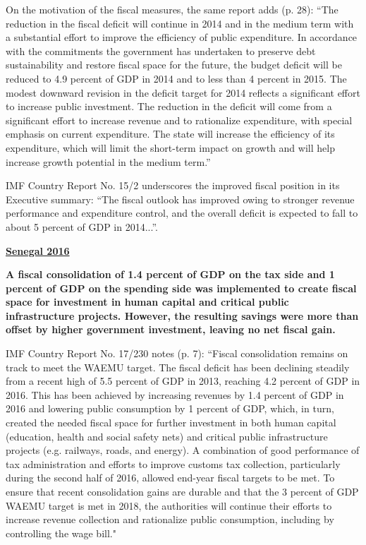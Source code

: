 On the motivation of the fiscal measures, the same report adds (p. 28): “The reduction in the fiscal deficit will continue in 2014 and in the medium term with a substantial effort to improve the efficiency of public expenditure. In accordance with the commitments the government has undertaken to preserve debt sustainability and restore fiscal space for the future, the budget deficit will be reduced to 4.9 percent of GDP in 2014 and to less than 4 percent in 2015. The modest downward revision in the deficit target for 2014 reflects a significant effort to increase public investment. The reduction in the deficit will come from a significant effort to increase revenue and to rationalize expenditure, with special emphasis on current expenditure. The state will increase the efficiency of its expenditure, which will limit the short-term impact on growth and will help increase growth potential in the medium term.”

IMF Country Report No. 15/2 underscores the improved fiscal position in its Executive summary: “The fiscal outlook has improved owing to stronger revenue performance and expenditure control, and the overall deficit is expected to fall to about 5 percent of GDP in 2014...”. 

\textbf{\underline{Senegal 2016}}

\textbf{A fiscal consolidation of 1.4 percent of GDP on the tax side and 1 percent of GDP on the spending side was implemented to create fiscal space for investment in human capital and critical public infrastructure projects. However, the resulting savings were more than offset by higher government investment, leaving no net fiscal gain.}

IMF Country Report No. 17/230 notes (p. 7): “Fiscal consolidation remains on track to meet the WAEMU target. The fiscal deficit has been declining steadily from a recent high of 5.5 percent of GDP in 2013, reaching 4.2 percent of GDP in 2016. This has been achieved by increasing revenues by 1.4 percent of GDP in 2016 and lowering public consumption by 1 percent of GDP, which, in turn, created the needed fiscal space for further investment in both human capital (education, health and social safety nets) and critical public infrastructure projects (e.g. railways, roads, and energy). A combination of good performance of tax administration and efforts to improve customs tax collection, particularly during the second half of 2016, allowed end-year fiscal targets to be met. To ensure that recent consolidation gains are durable and that the 3 percent of GDP WAEMU target is met in 2018, the authorities will continue their efforts to increase revenue collection and rationalize public consumption, including by controlling the wage bill."

